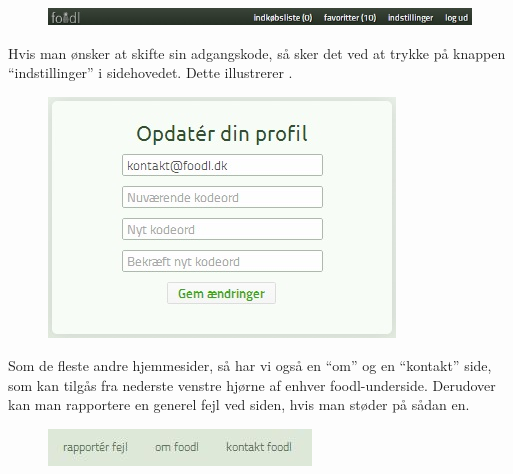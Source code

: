 \begin{figure}[H]
	\centering
	\includegraphics[scale=0.7]{billeder/foodl/header-login.jpg}
	\label{fig:foodl-loggetind}
\end{figure}

Hvis man ønsker at skifte sin adgangskode, så sker det ved at trykke på knappen ``indstillinger'' i sidehovedet. Dette illustrerer .

\begin{figure}[H]
	\centering
	\includegraphics[scale=0.7]{billeder/foodl/indstillinger.jpg}
	\label{fig:foodl-indstillinger}
\end{figure}

Som de fleste andre hjemmesider, så har vi også en ``om'' og en ``kontakt'' side, som kan tilgås fra nederste venstre hjørne af enhver foodl-underside. Derudover kan man rapportere en generel fejl ved siden, hvis man støder på sådan en.

\begin{figure}[H]
	\centering
	\includegraphics[scale=0.7]{billeder/foodl/formaliteter.jpg}
	\label{fig:foodl-formaliteter}
\end{figure}

